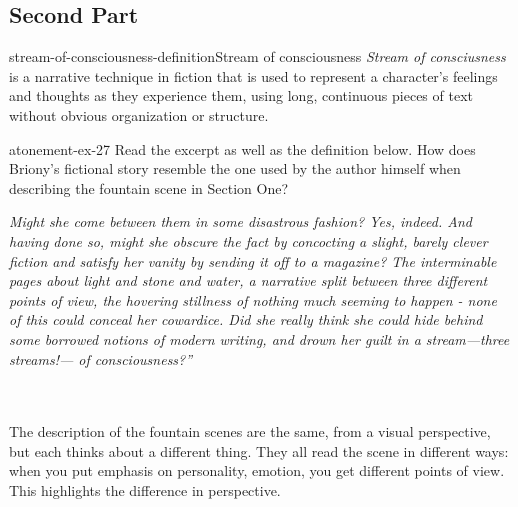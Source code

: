 \documentclass[preview]{standalone}
\begin{document}
\subsection{Second Part}

\begin{snippetdefinition}{stream-of-consciousness-definition}{Stream of consciousness}
    \textit{Stream of consciusness} is a narrative technique in fiction that is used to represent a character's
    feelings and thoughts as they experience them, using long, continuous pieces of text without
    obvious organization or structure.
\end{snippetdefinition}

\begin{snippetexercise}{atonement-ex-27}
    {Read the excerpt as well as the definition below. How does Briony's fictional story resemble the
    one used by the author himself when describing the fountain scene in Section One?}
    \hspace{0.1\textwidth}
    \begin{minipage}[r]{0.8\textwidth}
        \itshape
        Might she come between them in some disastrous fashion? Yes, indeed. And having done so, might 
        she obscure the fact by concocting a slight, barely clever fiction and satisfy her vanity by sending it
        off to a magazine? The interminable pages about light and stone and water, a narrative split
        between three different points of view, the hovering stillness of nothing much seeming to 
        happen - none of this could conceal her cowardice.
        Did she really think she could hide behind some borrowed notions of modern writing, 
        and drown her guilt in a stream—three streams!— of consciousness?”
    \end{minipage}
    \\\\
    The description of the fountain scenes are the same, from a visual perspective,
    but each thinks about a different thing.
    They all read the scene in different ways: when you put emphasis on personality, emotion,
    you get different points of view.
    This highlights the difference in perspective.
\end{snippetexercise}
\end{document}
